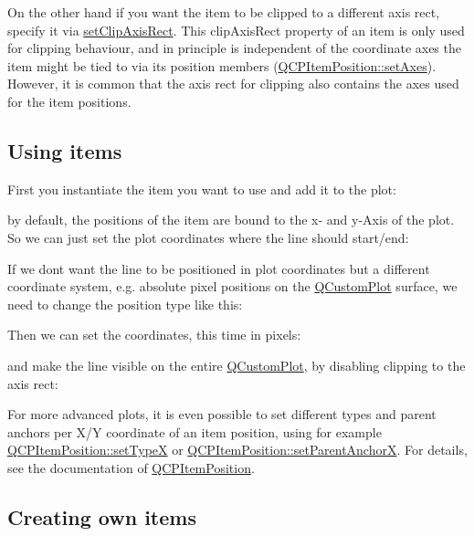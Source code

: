 On the other hand if you want the item to be clipped to a different axis rect, specify it via \mbox{\hyperlink{class_q_c_p_abstract_item_a7dc75fcbcd10206fe0b75d757ea7a347}{set\+Clip\+Axis\+Rect}}. This clip\+Axis\+Rect property of an item is only used for clipping behaviour, and in principle is independent of the coordinate axes the item might be tied to via its position members (\mbox{\hyperlink{class_q_c_p_item_position_a2185f45c75ac8cb9be89daeaaad50e37}{Q\+C\+P\+Item\+Position\+::set\+Axes}}). However, it is common that the axis rect for clipping also contains the axes used for the item positions.\hypertarget{class_q_c_p_abstract_item_items-using}{}\subsection{Using items}\label{class_q_c_p_abstract_item_items-using}
First you instantiate the item you want to use and add it to the plot\+: 
\begin{DoxyCodeInclude}{0}
\end{DoxyCodeInclude}
by default, the positions of the item are bound to the x-\/ and y-\/\+Axis of the plot. So we can just set the plot coordinates where the line should start/end\+: 
\begin{DoxyCodeInclude}{0}
\end{DoxyCodeInclude}
If we don\textquotesingle{}t want the line to be positioned in plot coordinates but a different coordinate system, e.\+g. absolute pixel positions on the \mbox{\hyperlink{class_q_custom_plot}{Q\+Custom\+Plot}} surface, we need to change the position type like this\+: 
\begin{DoxyCodeInclude}{0}
\end{DoxyCodeInclude}
Then we can set the coordinates, this time in pixels\+: 
\begin{DoxyCodeInclude}{0}
\end{DoxyCodeInclude}
and make the line visible on the entire \mbox{\hyperlink{class_q_custom_plot}{Q\+Custom\+Plot}}, by disabling clipping to the axis rect\+: 
\begin{DoxyCodeInclude}{0}
\end{DoxyCodeInclude}
 For more advanced plots, it is even possible to set different types and parent anchors per X/Y coordinate of an item position, using for example \mbox{\hyperlink{class_q_c_p_item_position_a2113b2351d6d00457fb3559a4e20c3ea}{Q\+C\+P\+Item\+Position\+::set\+TypeX}} or \mbox{\hyperlink{class_q_c_p_item_position_add71461a973927c74e42179480916d9c}{Q\+C\+P\+Item\+Position\+::set\+Parent\+AnchorX}}. For details, see the documentation of \mbox{\hyperlink{class_q_c_p_item_position}{Q\+C\+P\+Item\+Position}}.\hypertarget{class_q_c_p_abstract_item_items-subclassing}{}\subsection{Creating own items}\label{class_q_c_p_abstract_item_items-subclassing}
